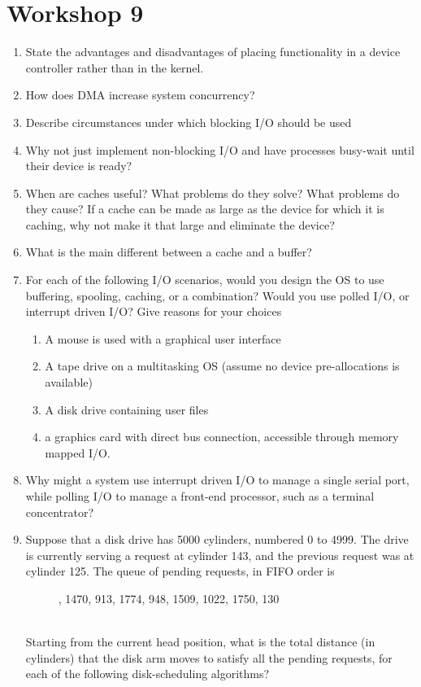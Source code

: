 \documentclass{article}
\begin{document}
	\section{Workshop 9}
	\begin{enumerate}
		\item State the advantages and disadvantages of placing functionality in a device controller rather than in the kernel.
		\item How does DMA increase system concurrency?
		\item Describe circumstances under which blocking I/O should be used
		\item Why not just implement non-blocking I/O and have processes busy-wait until their device is ready?
		\item When are caches useful? What problems do they solve? What problems do they cause? If a cache can be made as large as the device for which it is caching, why not make it that large and eliminate the device?
		\item What is the main different between a cache and a buffer?
		\item For each of the following I/O scenarios, would you design the OS to use buffering, spooling, caching, or a combination? Would you use polled I/O, or interrupt driven I/O? Give reasons for your choices
		\begin{enumerate}
			\item A mouse is used with a graphical user interface
			\item A tape drive on a multitasking OS (assume no device pre-allocations is available)
			\item A disk drive containing user files
			\item a graphics card with direct bus connection, accessible through memory mapped I/O.
		\end{enumerate}
		\item Why might a system use interrupt driven I/O to manage a single serial port, while polling I/O to manage a front-end processor, such as a terminal concentrator?
		\item Suppose that a disk drive has 5000 cylinders, numbered 0 to 4999. The drive is currently serving a request at cylinder 143, and the previous request was at cylinder 125. The queue of pending requests, in FIFO order is
		\begin{figure}[h]
			, 1470, 913, 1774, 948, 1509, 1022, 1750, 130
		\end{figure}\\ Starting from the current head position, what is the total distance (in cylinders) that the disk arm moves to satisfy all the pending requests, for each of the following disk-scheduling algorithms?

\end{enumerate}
\end{document}
